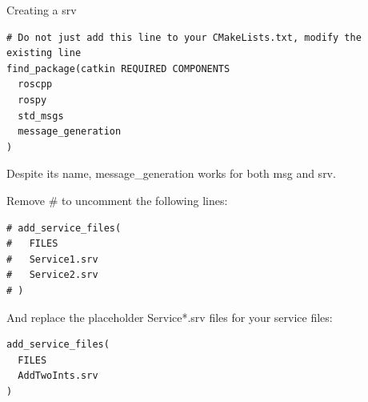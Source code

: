 \begin{frame}{Creating a srv}
\begin{lstlisting}[language=shell]
# Do not just add this line to your CMakeLists.txt, modify the existing line
find_package(catkin REQUIRED COMPONENTS
  roscpp
  rospy
  std_msgs
  message_generation
)
\end{lstlisting}

Despite its name, message\_generation works for both msg and srv.

Remove \# to uncomment the following lines:
\begin{lstlisting}[language=shell]
# add_service_files(
#   FILES
#   Service1.srv
#   Service2.srv
# )
\end{lstlisting}

And replace the placeholder Service*.srv files for your service files:
\begin{lstlisting}[language=shell]
add_service_files(
  FILES
  AddTwoInts.srv
)
\end{lstlisting}
\end{frame}

